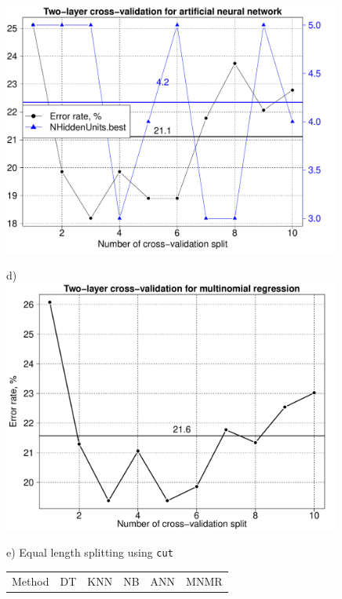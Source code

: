 \documentclass[10pt, paper=a4]{article}
\begin{document}
\begin{figure}[h!]
\begin{minipage}{0.49\textwidth}
    \includegraphics[width = 0.99\textwidth]{artificial_neural_network_CV2.pdf}
  \end{minipage} \hfill
  \begin{minipage}{0.49\textwidth}
    d)\\
    \includegraphics[width = 0.99\textwidth]{multinomial_regression_CV1.pdf}
  \end{minipage} \vfill
  \begin{minipage}{0.49\textwidth}
    e) Equal length splitting using \verb|cut|\\
    \begin{center}
    \begin{tabular}{c|c|c|c|c|c}
      \toprule
      Method & DT & KNN & NB & ANN & MNMR\\

\end{tabular}
\end{center}
\end{minipage}
\end{figure}
\end{document}
